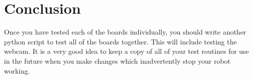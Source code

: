 \documentclass[a4paper, 12pt]{article}
\begin{document}




\newpage


\newpage


\section{Conclusion}
Once you have tested each of the boards individually, you should write another python script to test all of the boards together. This will include testing the webcam. It is a very good idea to keep a copy of all of your test routines for use in the future when you make changes which inadvertently stop your robot working.

\newpage

\end{document}
